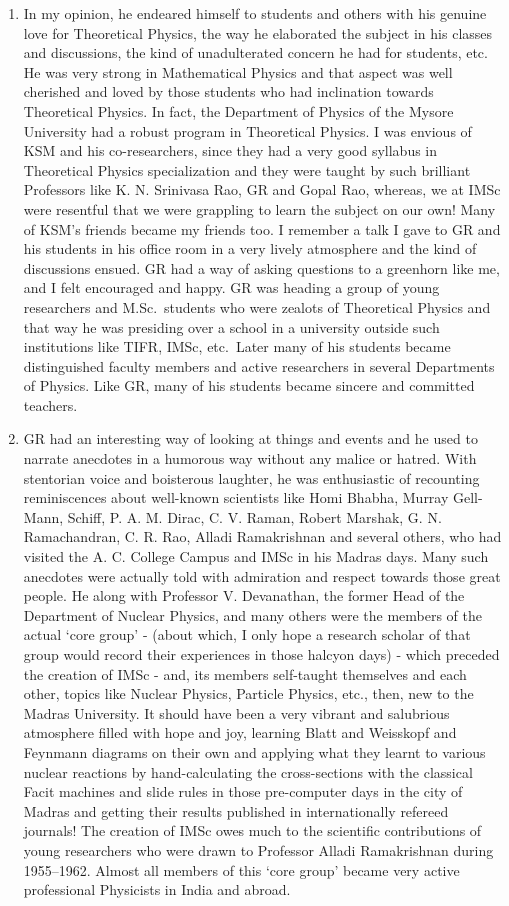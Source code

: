 \begin{enumerate}
\itemsep=0pt
\item In my opinion, he endeared himself to students and others with his genuine love for Theoretical Physics, the way he elaborated the subject in his classes and discussions, the kind of unadulterated concern he had for students, etc. He was very strong in Mathematical Physics and that aspect was well cherished and loved by those students who had inclination towards Theoretical Physics. In fact, the Department of Physics of the Mysore University had a robust program in Theoretical Physics. I was envious of KSM and his co-researchers, since they had a very good syllabus in Theoretical Physics specialization and they were taught by such brilliant Professors like K. N. Srinivasa Rao, GR and Gopal Rao, whereas, we at IMSc were resentful that we were grappling to learn the subject on our own! Many of KSM's friends became my friends too. I remember a talk I gave to GR and his students in his office room in a very lively atmosphere and the kind of discussions ensued. GR had a way of asking questions to a greenhorn like me, and I felt encouraged and happy. GR was heading a group of young researchers and M.Sc.\ students who were zealots of Theoretical Physics and that way he was presiding over a school in a university outside such institutions like TIFR, IMSc, etc.\ Later many of his students became distinguished faculty members and active researchers in several Departments of Physics. Like GR, many of his students became sincere and committed teachers.
\item GR had an interesting way of looking at things and events and he used to narrate anecdotes in a humorous way without any malice or hatred. With stentorian voice and boisterous laughter, he was enthusiastic of recounting reminiscences about well-known scientists like Homi Bhabha, Murray Gell-Mann, Schiff, P. A. M. Dirac, C. V. Raman, Robert Marshak, G. N. Ramachandran, C. R. Rao, Alladi Ramakrishnan and several others, who had visited the A. C. College Campus and IMSc in his Madras days. Many such anecdotes were actually told with admiration and respect towards those great people. He along with Professor V. Devanathan, the former Head of the Department of Nuclear Physics, and many others were the members of the actual `core group' - (about which, I only hope a research scholar of that group would record their experiences in those halcyon days) - which preceded the creation of IMSc - and, its members self-taught themselves and each other, topics like Nuclear Physics, Particle Physics, etc., then, new to the Madras University. It should have been a very vibrant and salubrious atmosphere filled with hope and joy, learning Blatt and Weisskopf and Feynmann diagrams on their own and applying what they learnt to various nuclear reactions by hand-calculating the cross-sections with the classical Facit machines and slide rules in those pre-computer days in the city of Madras and getting their results published in internationally refereed journals! The creation of IMSc owes much to the scientific contributions of young researchers who were drawn to Professor Alladi Ramakrishnan during 1955--1962. Almost all members of this `core group' became very active professional Physicists in India and abroad.

\end{enumerate}
